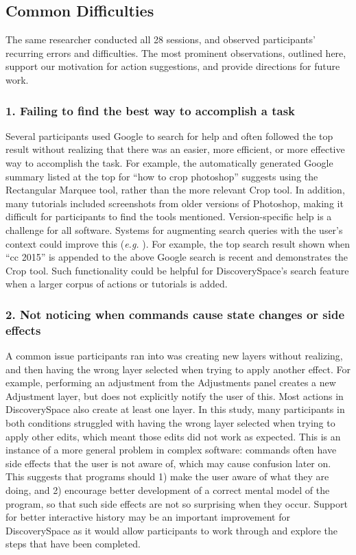 \subsection{Common Difficulties}
The same researcher conducted all 28 sessions, and observed participants' recurring errors and difficulties. The most prominent observations, outlined here, support our motivation for action suggestions, and provide directions for future work.

\subsubsection{1. Failing to find the best way to accomplish a task}
Several participants used Google to search for help and often followed the top result without realizing that there was an easier, more efficient, or more effective way to accomplish the task. For example, the automatically generated Google summary listed at the top for ``how to crop photoshop'' suggests using the Rectangular Marquee tool, rather than the more relevant Crop tool. In addition, many tutorials included screenshots from older versions of Photoshop, making it difficult for participants to find the tools mentioned. Version-specific help is a challenge for all software. Systems for augmenting search queries with the user's context could improve this (\textit{e.g.} \cite{Brandt2010}). For example, the top search result shown when ``cc 2015'' is appended to the above Google search is recent and demonstrates the Crop tool. Such functionality could be helpful for Discovery\-Space's search feature when a larger corpus of actions or tutorials is added.

\subsubsection{2. Not noticing when commands cause state changes or side effects}
A common issue participants ran into was creating new layers without realizing, and then having the wrong layer selected when trying to apply another effect. For example, performing an adjustment from the Adjustments panel creates a new Adjustment layer, but does not explicitly notify the user of this. Most actions in Discovery\-Space also create at least one layer. In this study, many participants in both conditions struggled with having the wrong layer selected when trying to apply other edits, which meant those edits did not work as expected. This is an instance of a more general problem in complex software: commands often have side effects that the user is not aware of, which may cause confusion later on. This suggests that programs should 1) make the user aware of what they are doing, and 2) encourage better development of a correct mental model of the program, so that such side effects are not so surprising when they occur. Support for better interactive history may be an important improvement for Discovery\-Space as it would allow participants to work through and explore the steps that have been completed.


